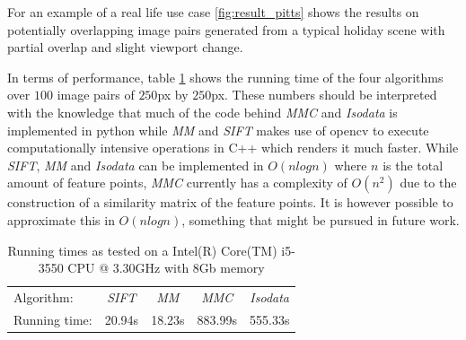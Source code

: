 \documentclass[12pt,journal]{IEEEtran}
\begin{document}
For an example of a real life use case \ref{fig:result_pitts} shows the 
results on potentially overlapping image pairs generated from a typical 
holiday scene with partial overlap and slight viewport change.

In terms of performance, table \ref{table:running_times} shows the 
running time of the four algorithms over $100$ image pairs of $250$px by 
$250$px. These numbers should be interpreted with the knowledge that 
much of the code behind \emph{MMC} and \emph{Isodata} is implemented in 
python while \emph{MM} and \emph{SIFT} makes use of opencv to execute 
computationally intensive operations in C++ which renders it much 
faster. While \emph{SIFT}, \emph{MM} and \emph{Isodata} can be 
implemented in $O(nlogn)$ where $n$ is the total amount of feature 
points, \emph{MMC} currently has a complexity of $O(n^2)$ due to the 
construction of a similarity matrix of the feature points. It is however 
possible to approximate this in $O(nlogn)$, something that might be 
pursued in future work.
%
\begin{savenotes}
\begin{table}
	\centering
	\small
\begin{tabular}{l*{4}{c}}
	Algorithm: & \emph{SIFT} & \emph{MM} & \emph{MMC} & \emph{Isodata} 
	\\
	\noalign{\smallskip} 
	Running time: & 20.94s & 18.23s & 883.99s & 555.33s \\
\end{tabular}
\caption{Running times as tested on a Intel(R) Core(TM) i5-3550 CPU @ 
3.30GHz with 8Gb memory}
\label{table:running_times}
\end{table}
\end{savenotes}
%
\end{document}
